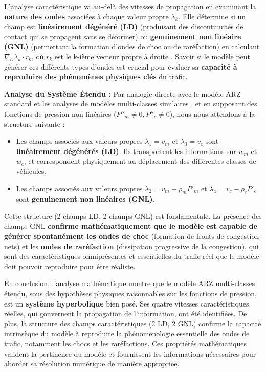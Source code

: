L'analyse caractéristique va au-delà des vitesses de propagation en examinant la \textbf{nature des ondes} associées à chaque valeur propre \(\lambda_k\). Elle détermine si un champ est \textbf{linéairement dégénéré (LD)} (produisant des discontinuités de contact qui se propagent sans se déformer) ou \textbf{genuinement non linéaire (GNL)} (permettant la formation d'ondes de choc ou de raréfaction) en calculant \( \nabla_U \lambda_k \cdot r_k \), où \( r_k \) est le k-ième vecteur propre à droite \cite{LeVeque2002}. Savoir si le modèle peut générer ces différents types d'ondes est crucial pour évaluer sa \textbf{capacité à reproduire des phénomènes physiques clés} du trafic.

\textbf{Analyse du Système Étendu :} Par analogie directe avec le modèle ARZ standard et les analyses de modèles multi-classes similaires \cite{AwKlarMaterneRascle2000, BenzoniGavageColombo2003, FanWork2015}, et en supposant des fonctions de pression non linéaires (\( P''_m \neq 0, P''_c \neq 0 \)), nous nous attendons à la structure suivante :
\begin{itemize}
    \item Les champs associés aux valeurs propres \( \lambda_1 = v_m \) et \( \lambda_3 = v_c \) sont \textbf{linéairement dégénérés (LD)}. Ils transportent les informations sur \( w_m \) et \( w_c \), et correspondent physiquement au déplacement des différentes classes de véhicules.
    \item Les champs associés aux valeurs propres \( \lambda_2 = v_m - \rho_m P'_m \) et \( \lambda_4 = v_c - \rho_c P'_c \) sont \textbf{genuinement non linéaires (GNL)}.
\end{itemize}
Cette structure (2 champs LD, 2 champs GNL) est fondamentale. La présence des champs GNL \textbf{confirme mathématiquement que le modèle est capable de générer spontanément les ondes de choc} (formation de fronts de congestion nets) et les \textbf{ondes de raréfaction} (dissipation progressive de la congestion), qui sont des caractéristiques omniprésentes et essentielles du trafic réel que le modèle doit pouvoir reproduire pour être réaliste.

En conclusion, l'analyse mathématique montre que le modèle ARZ multi-classes étendu, sous des hypothèses physiques raisonnables sur les fonctions de pression, est un \textbf{système hyperbolique} bien posé. Ses quatre vitesses caractéristiques réelles, qui gouvernent la propagation de l'information, ont été identifiées. De plus, la structure des champs caractéristiques (2 LD, 2 GNL) confirme la capacité intrinsèque du modèle à reproduire la phénoménologie essentielle des ondes de trafic, notamment les chocs et les raréfactions. Ces propriétés mathématiques valident la pertinence du modèle et fournissent les informations nécessaires pour aborder sa résolution numérique de manière appropriée.


